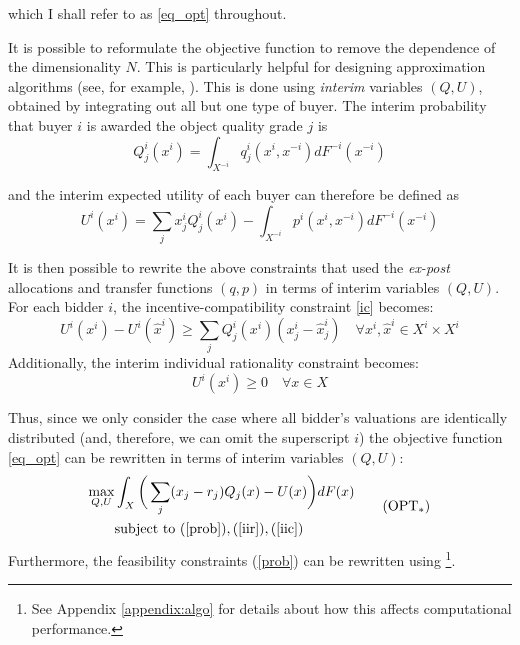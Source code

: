 \documentclass{article}
\begin{document}
\noindent which I shall refer to as \ref{eq_opt} throughout. 

It is possible to reformulate the objective function to remove the dependence of the dimensionality $N$. This is particularly helpful for designing approximation algorithms (see, for example, \cite{belloni2010multidimensional}). This is done using \textit{interim} variables $(Q, U)$, obtained by integrating out all but one type of buyer. The interim probability that buyer $i$ is awarded the object quality grade $j$ is
\begin{equation}
    Q_j^i(x^i) = \int_{X^{-i}} q_j^i(x^i,x^{-i}) dF^{-i}(x^{-i})
\end{equation}

\noindent and the interim expected utility of each buyer can therefore be defined as
\begin{equation}
    U^i(x^i) = \sum_j x_j^i Q_j^i(x^i) - \int_{X^{-i}} p^i(x^i,x^{-i}) dF^{-i}(x^{-i})
\end{equation}

It is then possible to rewrite the above constraints that used the \textit{ex-post} allocations and transfer functions $(q,p)$ in terms of interim variables $(Q,U)$. For each bidder $i$, the incentive-compatibility constraint \ref{ic} becomes:
\begin{equation}\label{iic}
    U^i(x^i) - U^i(\hat{x}^i) \geq \sum_j Q_j^i(x^i) (x_j^i - \hat{x}_j^i) \quad \forall x^i, \hat{x}^i \in X^i \times X^i \tag{IIC}
\end{equation}
\noindent Additionally, the interim individual rationality constraint becomes:
\begin{equation}\label{iir}
    U^i(x^i) \geq 0 \quad \forall x \in X \tag{IIR}
\end{equation}

Thus, since we only consider the case where all bidder's valuations are identically distributed (and, therefore, we can omit the superscript $i$) the objective function \ref{eq_opt} can be rewritten in terms of interim variables $(Q,U)$:
\begin{equation}
\begin{aligned}\label{eq_opt_interim}
    \max_{Q,U} &\int_X \bigg( \sum_j (x_j - r_j) Q_j(x) - U(x) \bigg) dF(x) \\
    &\text{subject to } (\ref{prob}), (\ref{iir}), (\ref{iic})
\end{aligned}  \tag{OPT$_*$} 
\end{equation}
\noindent Furthermore, the feasibility constraints (\ref{prob}) can be rewritten using \autocite{border1991implementation}\footnote{See Appendix \ref{appendix:algo} for details about how this affects computational performance.}.
\end{document}
